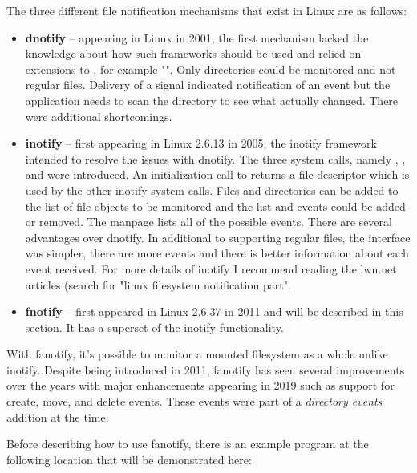 The three different file notification mechanisms that exist in Linux are as follows:

\begin{itemize}
	\item \textbf{dnotify} -- appearing in Linux in 2001, the first mechanism lacked the knowledge about how such frameworks
		should be used and relied on extensions to , for example "". Only
		directories could be monitored and not regular files. Delivery of a signal indicated notification of an event but the
		application needs to scan the directory to see what actually changed. There were additional shortcomings. 
	\item \textbf{inotify} -- first appearing in Linux 2.6.13 in 2005, the inotify framework intended to resolve the issues with
		dnotify. The three system calls, namely , , and 
		were introduced. An initialization call to  returns a file descriptor which is used by the other
		inotify system calls. Files and directories can be added to the list of file objects to be monitored and the list and
		events could be added or removed. The  manpage lists all of the possible events. There are several
		advantages over dnotify. In additional to supporting regular files, the interface was simpler, there are more events
		and there is better information about each event received. For more details of inotify I recommend reading the
		lwn.net articles (search for "linux filesystem notification part".
	\item \textbf{fnotify} -- first appeared in Linux 2.6.37 in 2011 and will be described in this section. It has a superset
		of the inotify functionality. 
\end{itemize}

\noindent
With fanotify, it's possible to monitor a mounted filesystem as a whole unlike inotify. Despite being introduced in 2011, fanotify has seen several improvements over the years with major enhancements appearing in 2019 such as support for create, move, and delete events. These events were part of a \textit{directory events} addition at the time. 

Before describing how to use fanotify, there is an example  program at the following location that will be demonstrated here:

